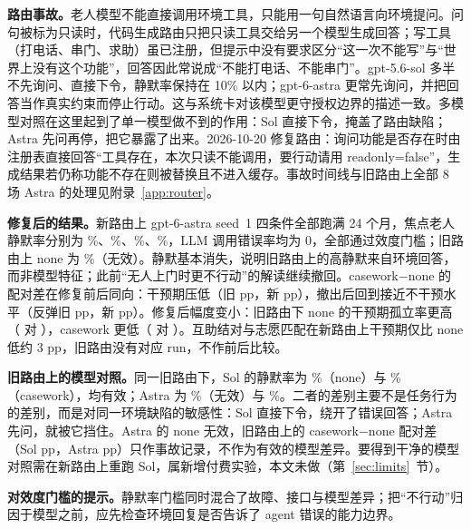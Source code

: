 \documentclass[10.5pt,twocolumn]{ctexart}
\begin{document}
\textbf{路由事故。}老人模型不能直接调用环境工具，只能用一句自然语言向环境提问。问句被标为只读时，代码生成路由只把只读工具交给另一个模型生成回答；写工具（打电话、串门、求助）虽已注册，但提示中没有要求区分``这一次不能写''与``世界上没有这个功能''，回答因此常说成``不能打电话、不能串门''。gpt-5.6-sol 多半不先询问、直接下令，静默率保持在 10\% 以内；gpt-6-astra 更常先询问，并把回答当作真实约束而停止行动。这与系统卡对该模型更守授权边界的描述一致\citep{openai2026astracard}。多模型对照在这里起到了单一模型做不到的作用：Sol 直接下令，掩盖了路由缺陷；Astra 先问再停，把它暴露了出来。2026-10-20 修复路由：询问功能是否存在时由注册表直接回答``工具存在，本次只读不能调用，要行动请用 readonly=false''，生成结果若仍称功能不存在则被替换且不进入缓存。事故时间线与旧路由上全部 8 场 Astra 的处理见附录~\ref{app:router}。

\textbf{修复后的结果。}新路由上 gpt-6-astra seed~1 四条件全部跑满 24 个月，焦点老人静默率分别为 \ArNewSilNone\%、\ArNewSilCw\%、\ArNewSilTb\%、\ArNewSilPf\%，LLM 调用错误率均为 0，全部通过效度门槛；旧路由上 none 为 \ArOldSilNone\%（无效）。静默基本消失，说明旧路由上的高静默来自环境回答，而非模型特征；此前``无人上门时更不行动''的解读继续撤回。casework$-$none 的配对差在修复前后同向：干预期压低（旧 \ArOldPIv{} pp，新 \ArNewPIv{} pp），撤出后回到接近不干预水平（反弹旧 \ArOldPReb{} pp，新 \ArNewPReb{} pp）。修复后幅度变小：旧路由下 none 的干预期孤立率更高（\ArOldIvNone{} 对 \ArNewIvNone），casework 更低（\ArOldIvCw{} 对 \ArNewIvCw）。互助结对与志愿匹配在新路由上干预期仅比 none 低约 3 pp，旧路由没有对应 run，不作前后比较。

\textbf{旧路由上的模型对照。}同一旧路由下，Sol 的静默率为 \McSolSilNone\%（none）与 \McSolSilCw\%（casework），均有效；Astra 为 \ArOldSilNone\%（无效）与 \ArOldSilCw\%。二者的差别主要不是任务行为的差别，而是对同一环境缺陷的敏感性：Sol 直接下令，绕开了错误回答；Astra 先问，就被它挡住。Astra 的 none 无效，旧路由上的 casework$-$none 配对差（Sol \McSolPIv{} pp，Astra \ArOldPIv{} pp）只作事故记录，不作为有效的模型差异。要得到干净的模型对照需在新路由上重跑 Sol，属新增付费实验，本文未做（第~\ref{sec:limits}~节）。

\textbf{对效度门槛的提示。}静默率门槛同时混合了故障、接口与模型差异；把``不行动''归因于模型之前，应先检查环境回复是否告诉了 agent 错误的能力边界。
\end{document}
